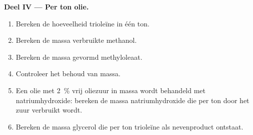 \begin{problem}
\medskip
\noindent\textbf{Deel IV --- Per ton olie.}
\begin{enumerate}[resume]
  \item Bereken de hoeveelheid trioleïne in één ton.
  \item Bereken de massa verbruikte methanol.
  \item Bereken de massa gevormd methyloleaat.
  \item Controleer het behoud van massa.
  \item Een olie met 2~\% vrij oliezuur in massa wordt behandeld met natriumhydroxide: bereken de massa
        natriumhydroxide die per ton door het zuur verbruikt wordt.
  \item Bereken de massa glycerol die per ton trioleïne als nevenproduct ontstaat.
\end{enumerate}
\end{problem}
